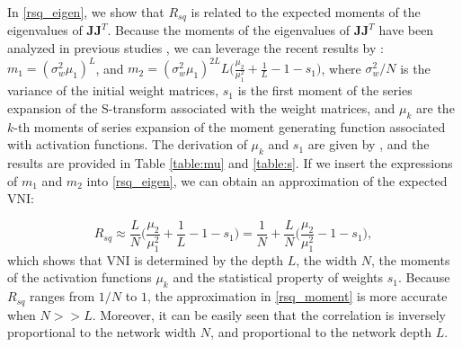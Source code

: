 

In \eqref{rsq_eigen}, we show that  $R_{sq}$ is related to the expected moments of the
eigenvalues of $\mathbf{JJ}^T$. Because the moments of the eigenvalues of $\mathbf{JJ}^T$
have been analyzed in previous studies \cite{mft:spectral}, we can leverage the recent
results by \cite{mft:spectral}: $m_1=(\sigma_w^2\mu_1)^L$, and
$m_2=(\sigma_w^2\mu_1)^{2L}L\Big(\frac{\mu_2}{\mu_1^2}+\frac{1}{L}-1-s_1\Big)$,
where $\sigma_w^2/N$ is the variance of the initial weight matrices, $s_1$ is the first
moment of the series expansion of the S-transform associated with the weight matrices, and
$\mu_k$ are the $k$-th moments of series expansion of the moment generating function
associated with activation functions.
The derivation of $\mu_k$ and $s_1$ are given by \cite{mft:spectral}, and the results are
provided in Table \ref{table:mu} and \ref{table:s}.
If we insert the expressions of $m_1$ and $m_2$ into \eqref{rsq_eigen}, we can obtain an
approximation of the expected VNI:

\begin{equation}
    R_{sq}\approx \frac{L}{N}\Big(\frac{\mu_2}{\mu_1^2}+\frac{1}{L}-1-s_1\Big)
    =
    \frac{1}{N}+\frac{L}{N}\Big(\frac{\mu_2}{\mu_1^2}-1-s_1\Big)
    ,
    \label{rsq_moment}
\end{equation}
which shows that VNI is determined by the depth $L$, the width $N$, the moments of the activation functions $\mu_k$ and the statistical property of weights $s_1$. 
Because $R_{sq}$ ranges from $1/N$ to $1$, the approximation in \eqref{rsq_moment} is more accurate when $N>>L$.
Moreover, it can be easily seen that the correlation is inversely proportional to the network width $N$, and proportional to the network depth $L$.

